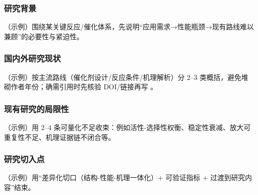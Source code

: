 
\subsubsection{研究背景}
\justifying\indent
（示例）围绕某关键反应/催化体系，先说明“应用需求→性能瓶颈→现有路线难以兼顾”的必要性与紧迫性。

\subsubsection{国内外研究现状}
\indent
（示例）按主流路线（催化剂设计/反应条件/机理解析）分 2–3 类概括，避免堆砌作者年份；确需引用时先核验 DOI/链接再写 \cite{...}。

\subsubsection{现有研究的局限性}
\indent
（示例）用 2–4 条可量化不足收束：例如活性-选择性权衡、稳定性衰减、放大可重复性不足、机理证据链不闭合等。

\subsubsection{研究切入点}
\indent
（示例）用“差异化切口（结构-性能-机理一体化）+ 可验证指标 + 过渡到研究内容”结束。

